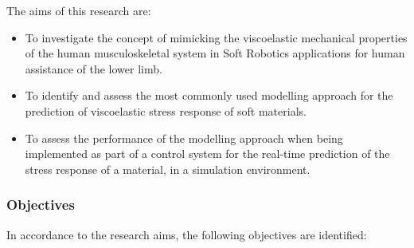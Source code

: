 The aims of this research are:

\begin{itemize}
    \item To investigate the concept of mimicking the viscoelastic mechanical properties of the human musculoskeletal system in Soft Robotics applications for human assistance of the lower limb.
    \item To identify and assess the most commonly used modelling approach for the prediction of viscoelastic stress response of soft materials.
    \item To assess the performance of the modelling approach when being implemented as part of a control system for the real-time prediction of the stress response of a material, in a simulation environment.
\end{itemize}

\subsubsection{Objectives}

In accordance to the research aims, the following objectives are identified:

